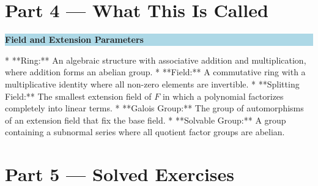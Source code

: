 \documentclass[12pt, a4paper]{article}
\newenvironment{namedconcept}[1]
  {\par\medskip\fillcolorbox{LightBlue}{NavyBlue}{#1}}
  {\par\medskip}
\newcommand{\fillcolorbox}[3]{%
  \noindent
  \filldrawbox{#1}{#2}{\textbf{\sffamily\color{white}#3}}\par\nobreak\vspace{4pt}
}
\newcommand{\filldrawbox}[3]{%
  \colorbox{#1}{\parbox{\dimexpr\linewidth-2\fboxsep\relax}{%
    \vspace{4pt}\noindent\hspace{4pt}#3\vspace{4pt}%
  }}%
}
\begin{document}
\newpage

\section{Part 4 --- What This Is Called}

\begin{namedconcept}{Field and Extension Parameters}
* **Ring:** An algebraic structure with associative addition and multiplication, where addition forms an abelian group.
* **Field:** A commutative ring with a multiplicative identity where all non-zero elements are invertible.
* **Splitting Field:** The smallest extension field of $F$ in which a polynomial factorizes completely into linear terms.
* **Galois Group:** The group of automorphisms of an extension field that fix the base field.
* **Solvable Group:** A group containing a subnormal series where all quotient factor groups are abelian.
\end{namedconcept}

\newpage

\section{Part 5 --- Solved Exercises}
\end{document}
